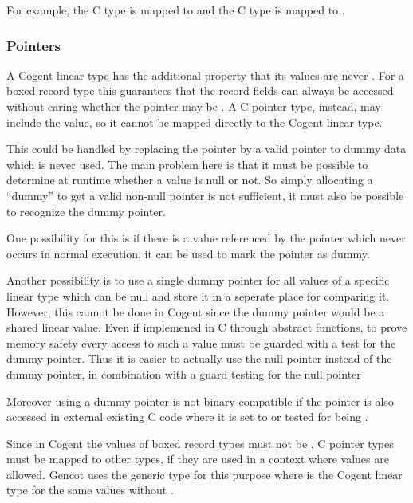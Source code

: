 For example, the C type  is mapped to  and the C type  is mapped
to .

\subsubsection{ Pointers}

A Cogent linear type has the additional property that its values are never . For a boxed record type this
guarantees that the record fields can always be accessed without caring whether the pointer may be .
A C pointer type, instead, may include the  value, so it cannot be mapped directly to the Cogent linear type.

This could be handled by replacing the  pointer by a valid pointer to dummy data which is never used.
The main problem here is that it must be possible to determine at runtime whether a value is null or not. So simply
allocating a ``dummy'' to get a valid non-null pointer is not sufficient, it must also be possible to recognize the 
dummy pointer.

One possibility for this is if there is a value referenced by the pointer which never occurs in normal execution,
it can be used to mark the pointer as dummy. 

Another possibility is to use a single dummy pointer for all values of a specific linear type which can be null and store it 
in a seperate place for comparing it. However, this cannot be done in Cogent since the dummy pointer would be a shared linear 
value. Even if implemened in C through abstract functions, to prove memory safety every access to such a value must 
be guarded with a test for the dummy pointer. Thus it is easier to actually use the null pointer instead of the dummy pointer,
in combination with a guard testing for the null pointer

Moreover using a dummy pointer is not binary compatible if the pointer is also accessed in external existing C code where 
it is set to  or tested for being .

Since in Cogent the values of boxed record types must not be , C pointer types must be mapped to other types, if 
they are used in a context where  values are allowed. Gencot uses the generic type  for this purpose
where  is the Cogent linear type for the same values without .

